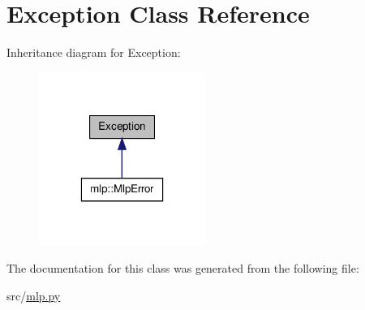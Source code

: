 \hypertarget{classException}{
\section{Exception Class Reference}
\label{classException}
}


Inheritance diagram for Exception:\nopagebreak
\begin{figure}[H]
\begin{center}
\leavevmode
\includegraphics[width=154pt]{classException__inherit__graph}
\end{center}
\end{figure}


The documentation for this class was generated from the following file:\begin{DoxyCompactItemize}
\item 
src/\hyperlink{mlp_8py}{mlp.py}\end{DoxyCompactItemize}
